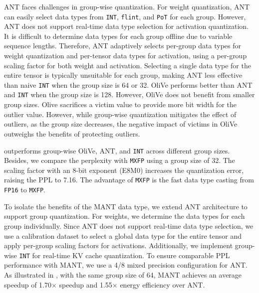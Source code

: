 ANT faces challenges in group-wise quantization.
For weight quantization, ANT can easily select data types from \texttt{INT}, \texttt{flint}, and \texttt{PoT} for each group.
However, ANT does not support real-time data type selection for activation quantization.
It is difficult to determine data types for each group offline due to variable sequence lengths.
Therefore, ANT adaptively selects per-group data types for weight quantization and per-tensor data types for activation, using a per-group scaling factor for both weight and activation.
Selecting a single data type for the entire tensor is typically unsuitable for each group, making ANT less effective than naive \texttt{INT} when the group size is 64 or 32.
OliVe performs better than ANT and \texttt{INT} when the group size is 128.
However, OliVe does not benefit from smaller group sizes.
Olive sacrifices a victim value to provide more bit width for the outlier value.
However, while group-wise quantization mitigates the effect of outliers, as the group size decreases, the negative impact of victims in OliVe outweighs the benefits of protecting outliers.

\proj outperforms group-wise OliVe, ANT, and \texttt{INT} across different group sizes.
Besides, we compare the perplexity with \texttt{MXFP} using a group size of 32.
The scaling factor with an 8-bit exponent (E8M0) increases the quantization error, raising the PPL to 7.16.
The advantage of \texttt{MXFP} is the fast data type casting from \texttt{FP16} to \texttt{MXFP}.

To isolate the benefits of the MANT data type, we extend ANT architecture to support group quantization.
For weights, we determine the data types for each group individually.
Since ANT does not support real-time data type selection, we use a calibration dataset to select a global data type for the entire tensor and apply per-group scaling factors for activations.
Additionally, we implement group-wise \texttt{INT} for real-time KV cache quantization.
To ensure comparable PPL performance with MANT, we use a 4/8 mixed precision configuration for ANT.
As illustrated in , with the same group size of 64, MANT achieves an average speedup of 1.70$\times$ speedup and 1.55$\times$ energy efficiency over ANT.








